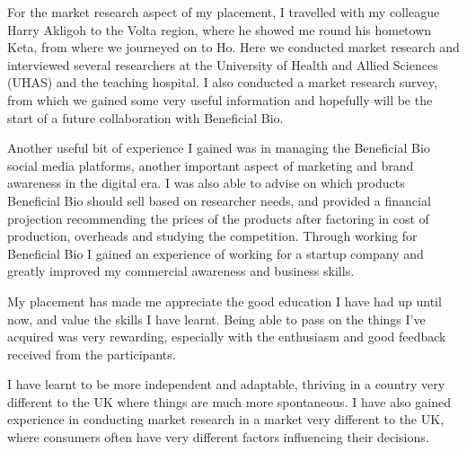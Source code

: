 For the market research aspect of my placement, I travelled with my colleague
Harry Akligoh to the Volta region, where he showed me round his hometown
Keta, from where we journeyed on to Ho. Here we conducted market
research and interviewed several researchers at the University of Health
and Allied Sciences (UHAS) and the teaching hospital. I also conducted a
market research survey, from which we gained some very useful
information and hopefully will be the start of a future collaboration
with Beneficial Bio.

Another useful bit of experience I gained was in managing the Beneficial
Bio social media platforms, another important aspect of marketing and
brand awareness in the digital era. I was also able to advise on which
products Beneficial Bio should sell based on researcher needs, and
provided a financial projection recommending the prices of the products
after factoring in cost of production, overheads and studying the
competition. Through working for Beneficial Bio I gained an experience
of working for a startup company and greatly improved my commercial
awareness and business skills.

My placement has made me appreciate the good education I have had up
until now, and value the skills I have learnt. Being able to pass on the
things I've acquired was very rewarding, especially with the enthusiasm
and good feedback received from the participants.

I have learnt to be more independent and adaptable, thriving in a
country very different to the UK where things are much more spontaneous.
I have also gained experience in conducting market research in a market
very different to the UK, where consumers often have very different
factors influencing their decisions.